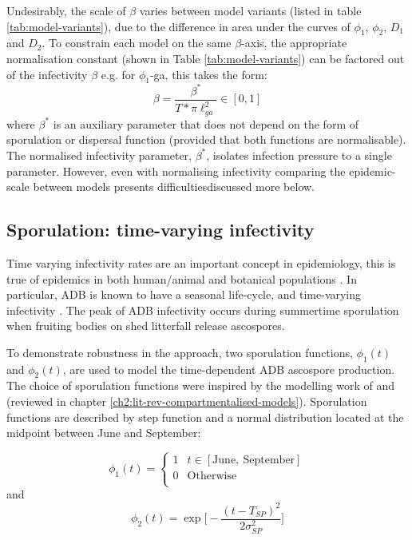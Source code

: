 Undesirably, the scale of $\beta$ varies between model variants (listed in table \ref{tab:model-variants}), due to the difference in area under the curves of $\phi_1$, $\phi_2$, $D_1$ and $D_2$.
To constrain each model on the same $\beta$-axis, the appropriate normalisation constant (shown in Table \ref{tab:model-variants}) can be factored out of the infectivity $\beta$ 
e.g. for $\phi_1$-ga, this takes the form: 
\begin{equation}
    \beta = \frac{\beta^*}{T * \pi \ell^2_{ga}} \in [0, 1]
\label{eq:normalised-beta}
\end{equation}
where $\beta^*$ is an auxiliary parameter that does not depend on the form of sporulation or dispersal function (provided that both functions are normalisable).
The normalised infectivity parameter, $\beta^*$, isolates infection pressure to a single parameter.
However, even with normalising infectivity comparing the epidemic-scale between models presents difficulties\textemdash discussed more below.

\subsection{Sporulation: time-varying infectivity}
\label{ch6:sporulation}

Time varying infectivity rates are an important concept in epidemiology, this is true of epidemics in both human/animal \cite{svensson2007note, liu2012infectious} 
and botanical populations \cite{suffert2018some, leclerc2014estimating, time-varying-infectivity}.
In particular, ADB is known to have a seasonal life-cycle, and time-varying infectivity \cite{grosdidier2018tracking, hietala2013invasive}. 
The peak of ADB infectivity occurs during summertime sporulation when fruiting bodies on shed litterfall release ascospores.

To demonstrate robustness in the approach, two sporulation functions, $\phi_1(t)$ and $\phi_2(t)$, are used to model the time-dependent ADB ascospore production.
The choice of sporulation functions were inspired by the modelling work of \cite{time-varying-infectivity} and \cite{segarra2001epidemic}
(reviewed in chapter \ref{ch2:lit-rev-compartmentalised-models}). 
Sporulation functions are described by step function and a normal distribution located at the midpoint between June and September:

\begin{equation}
\phi_1(t)  = \left\{
\begin{array}{ll}
      1 &  t \in [\mathrm{June,\ September}] \\
      0 & \mathrm{Otherwise} \\
\end{array} 
\right.
\end{equation}
and 
\begin{equation}
     \phi_2(t) =  \exp\big[-\frac{(t - T_{SP})^2}{2\sigma_{SP}^2}\big]
\end{equation}

